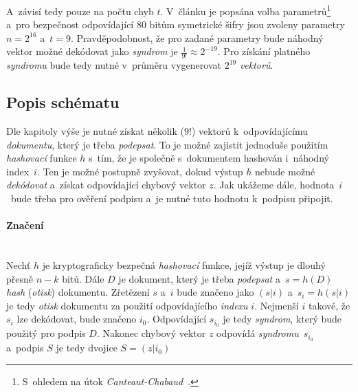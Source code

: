 \documentclass[thesis=M,czech,hidelinks]{FITthesis}[2012/06/26]
\newcommand{\0}{{\textcolor[gray]{0.75}{0}}}
\begin{document}

A~závisí tedy pouze na počtu chyb $t$. V~článku je popsána volba
parametrů\footnote{
    S~ohledem na útok \emph{Canteaut-Chabaud}~\cite{Canteaut}.
} a~pro bezpečnost odpovídající $80$ bitům symetrické šifry jsou zvoleny
parametry $n=2^{16}$ a~$t=9$.  Pravděpodobnost, že pro zadané parametry bude
náhodný vektor možné dekódovat jako \emph{syndrom} je $\frac{1}{9!} \approx
2^{-19}$. Pro získání platného \emph{syndromu} bude tedy nutné v~průměru
vygenerovat $2^{19}$ \emph{vektorů}.


\subsection{Popis schématu}

Dle kapitoly výše je nutné získat několik ($9!$) vektorů k~odpovídajícímu
\emph{dokumentu}, který je třeba \emph{podepsat}. To je možné zajistit jednoduše
použitím \emph{hashovací} funkce $h$ s~tím, že je společně s~dokumentem hashován
i~náhodný index~$i$. Ten je možné postupně zvyšovat, dokud výstup $h$ nebude
možné \emph{dekódovat} a~získat odpovídající chybový vektor $z$. Jak ukážeme
dále, hodnota~$i$~bude třeba pro ověření podpisu a~je nutné tuto hodnotu
k~podpisu připojit.


\paragraph{Značení} \hfil \\
Nechť $h$ je kryptograficky bezpečná \emph{hashovací} funkce, jejíž výstup je
dlouhý přesně $n-k$ bitů. Dále $D$ je dokument, který je třeba \emph{podepsat}
a~$ s = h\left(D\right)$ \emph{hash} (\emph{otisk}) dokumentu. Zřetězení $s$ a~$i$
bude značeno jako $(s|i)$ a~$s_i = h(s|i)$ je tedy \emph{otisk} dokumentu za
použití odpovídajícího \emph{indexu} $i$. Nejmenší $i$ takové, že $s_i$ lze
dekódovat, bude značeno $i_0$. Odpovídající $s_{i_0}$ je tedy \emph{syndrom},
který bude použitý pro podpis $D$. Nakonec chybový vektor $z$ odpovídá
\emph{syndromu}~$s_{i_0}$ a~podpis $S$ je tedy dvojice $S = ( z | i_0 )$
\end{document}

